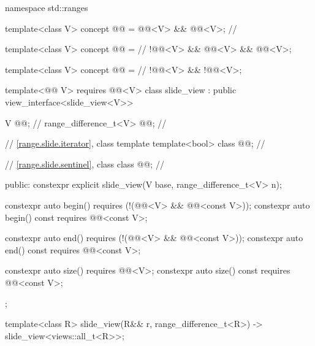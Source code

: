 %
%
%
\begin{codeblock}
namespace std::ranges {
  template<class V>
  concept @@ = @@<V> && @@<V>;       // \expos

  template<class V>
  concept @@ =                                            // \expos
    !@@<V> && @@<V> && @@<V>;

  template<class V>
  concept @@ =                                           // \expos
    !@@<V> && !@@<V>;

  template<@@ V>
    requires @@<V>
  class slide_view : public view_interface<slide_view<V>> {
    V @@;                            // \expos
    range_difference_t<V> @@;           // \expos

    // \ref{range.slide.iterator}, class template 
    template<bool> class @@;      // \expos

    // \ref{range.slide.sentinel}, class 
    class @@;                     // \expos

  public:
    constexpr explicit slide_view(V base, range_difference_t<V> n);

    constexpr auto begin()
      requires (!(@@<V> && @@<const V>));
    constexpr auto begin() const requires @@<const V>;

    constexpr auto end()
      requires (!(@@<V> && @@<const V>));
    constexpr auto end() const requires @@<const V>;

    constexpr auto size() requires @@<V>;
    constexpr auto size() const requires @@<const V>;
  };

  template<class R>
    slide_view(R&& r, range_difference_t<R>) -> slide_view<views::all_t<R>>;
}
\end{codeblock}

